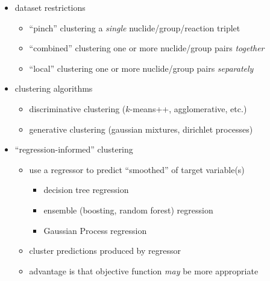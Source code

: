 \begin{itemize}[noitemsep]
  \item dataset restrictions
  \begin{itemize}[noitemsep]
    \item ``pinch'' clustering a \textit{single} nuclide/group/reaction triplet
    \item ``combined'' clustering one or more nuclide/group pairs \textit{together}
    \item ``local'' clustering one or more nuclide/group pairs \textit{separately}
  \end{itemize}
  \item clustering algorithms
  \begin{itemize}[noitemsep]
    \item discriminative clustering ($k$-means++, agglomerative, etc.)
    \item generative clustering (gaussian mixtures, dirichlet processes)
  \end{itemize}
  \item ``regression-informed'' clustering
  \begin{itemize}[noitemsep]
    \item use a regressor to predict ``smoothed'' of target variable(s)
    \begin{itemize}[noitemsep]
      \item decision tree regression
      \item ensemble (boosting, random forest) regression
      \item Gaussian Process regression
    \end{itemize}
    \item cluster predictions produced by regressor
    \item advantage is that objective function \textit{may} be more appropriate
  \end{itemize}
\end{itemize}